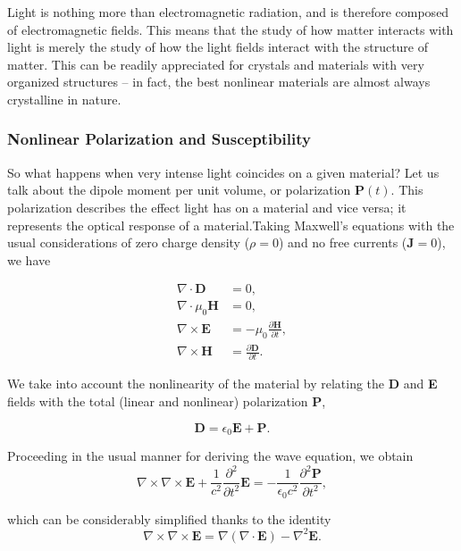 \documentclass[10pt]{article}
\begin{document}
Light is nothing more than electromagnetic radiation, and is therefore composed of electromagnetic fields. This means that the study of how matter interacts with light is merely the study of how the light fields interact with the structure of matter. This can be readily appreciated for crystals and materials with very organized structures -- in fact, the best nonlinear materials are almost always crystalline in nature.

\subsubsection{Nonlinear Polarization and Susceptibility}
So what happens when very intense light coincides on a given material? Let us talk about the dipole moment per unit volume, or polarization $\mathbf{P}(t)$. This polarization describes the effect light has on a material and vice versa; it represents the optical response of a material.Taking Maxwell's equations with the usual considerations of zero charge density ($\rho=0$) and no free currents ($\mathbf{J}=0$), we have

\begin{align}
\nabla\cdot\mathbf{D} &= 0,\label{eq_max_1}\\
\nabla\cdot\mu_{0}\mathbf{H} &= 0,\\
\nabla\times\mathbf{E} &= -\mu_{0}\frac{\partial\mathbf{H}}{\partial t},\\
\nabla\times\mathbf{H} &= \frac{\partial\mathbf{D}}{\partial t}.
\end{align}

We take into account the nonlinearity of the material by relating the \textbf{D} and \textbf{E} fields with the total (linear and nonlinear) polarization \textbf{P},

\begin{equation}
\mathbf{D} = \epsilon_{0}\mathbf{E} + \mathbf{P}.
\end{equation}

Proceeding in the usual manner for deriving the wave equation, we obtain
\begin{equation}
\nabla\times\nabla\times\mathbf{E} + \frac{1}{c^{2}}\frac{\partial^{2}}{\partial t^{2}}\mathbf{E} = -\frac{1}{\epsilon_{0}c^{2}}\frac{\partial^{2}\mathbf{P}}{\partial t^{2}},
\end{equation}

which can be considerably simplified thanks to the identity
\begin{equation}
\nabla\times\nabla\times\mathbf{E} = \nabla\left(\nabla\cdot\mathbf{E}\right)-\nabla^{2}\mathbf{E}.
\end{equation}
\end{document}
